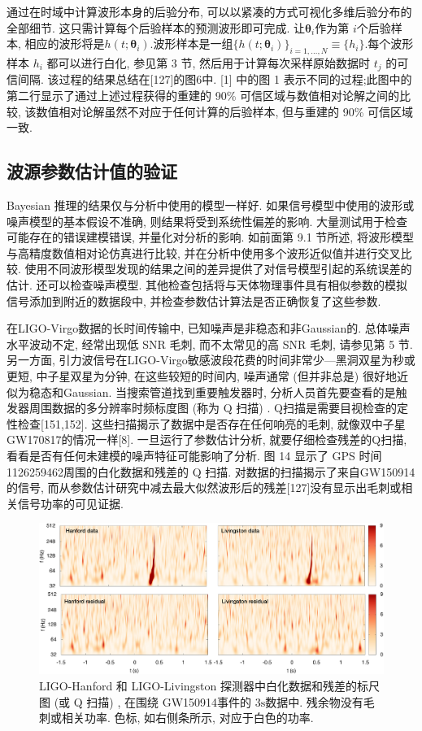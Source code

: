 \documentclass[a4paper]{\documentclassname}
\def\b{\boldsymbol}
\def\t{\text}
\theoremstyle{definition}
\begin{document}
通过在时域中计算波形本身的后验分布, 可以以紧凑的方式可视化多维后验分布的全部细节. 这只需计算每个后验样本的预测波形即可完成. 让$\b{\theta}_i$作为第 $i$个后验样本, 相应的波形将是$h (t;\b{\theta}_i) $.波形样本是一组$ \{h (t;\b{\theta}_i) \}_{i=1, \dots, N}\equiv \{h_i\}$.每个波形样本 $h_i$ 都可以进行白化, 参见第 3 节, 然后用于计算每次采样原始数据时 $t_j$ 的可信间隔. 该过程的结果总结在[127]的图6中. [1] 中的图 1 表示不同的过程;此图中的第二行显示了通过上述过程获得的重建的 90\%{} 可信区域与数值相对论解之间的比较, 该数值相对论解虽然不对应于任何计算的后验样本, 但与重建的 90\%{} 可信区域一致. 

\subsection{波源参数估计值的验证}

Bayesian 推理的结果仅与分析中使用的模型一样好. 如果信号模型中使用的波形或噪声模型的基本假设不准确, 则结果将受到系统性偏差的影响. 大量测试用于检查可能存在的错误建模错误, 并量化对分析的影响. 如前面第 9.1 节所述, 将波形模型与高精度数值相对论仿真进行比较, 并在分析中使用多个波形近似值并进行交叉比较. 使用不同波形模型发现的结果之间的差异提供了对信号模型引起的系统误差的估计. 还可以检查噪声模型. 其他检查包括将与天体物理事件具有相似参数的模拟信号添加到附近的数据段中, 并检查参数估计算法是否正确恢复了这些参数. 

在LIGO-Virgo数据的长时间传输中, 已知噪声是非稳态和非Gaussian的. 总体噪声水平波动不定, 经常出现低 SNR 毛刺, 而不太常见的高 SNR 毛刺, 请参见第 5 节. 另一方面, 引力波信号在LIGO-Virgo敏感波段花费的时间非常少---黑洞双星为秒或更短, 中子星双星为分钟, 在这些较短的时间内, 噪声通常 (但并非总是) 很好地近似为稳态和Gaussian. 当搜索管道找到重要触发器时, 分析人员首先要查看的是触发器周围数据的多分辨率时频标度图 (称为 Q 扫描) . Q扫描是需要目视检查的定性检查[151,152].  这些扫描揭示了数据中是否存在任何响亮的毛刺, 就像双中子星GW170817的情况一样[8]. 一旦运行了参数估计分析, 就要仔细检查残差的Q扫描, 看看是否有任何未建模的噪声特征可能影响了分析. 图 14 显示了 GPS 时间1126259462周围的白化数据和残差的 Q 扫描. 对数据的扫描揭示了来自GW150914的信号, 而从参数估计研究中减去最大似然波形后的残差[127]没有显示出毛刺或相关信号功率的可见证据. 
\begin{figure}[htbp]
    \centering
    \includegraphics{img/14.jpg}
    \caption{
        LIGO-Hanford 和 LIGO-Livingston 探测器中白化数据和残差的标尺图 (或 Q 扫描) , 在围绕 GW150914事件的 $3 \t{s}$数据中. 残余物没有毛刺或相关功率. 色标, 如右侧条所示, 对应于白色的功率. 
    }
\end{figure}
\end{document}
